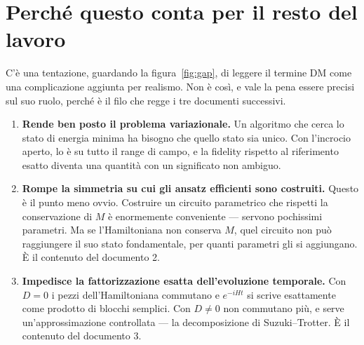 \documentclass[11pt,a4paper]{article}
\begin{document}
\FloatBarrier


\section{Perché questo conta per il resto del lavoro}

C'è una tentazione, guardando la figura~\ref{fig:gap}, di leggere il termine DM
come una complicazione aggiunta per realismo. Non è così, e vale la pena essere
precisi sul suo ruolo, perché è il filo che regge i tre documenti successivi.

\begin{enumerate}[leftmargin=1.5em,itemsep=4pt]
\item \textbf{Rende ben posto il problema variazionale.} Un algoritmo che cerca
lo stato di energia minima ha bisogno che quello stato sia unico. Con l'incrocio
aperto, lo è su tutto il range di campo, e la fidelity rispetto al riferimento
esatto diventa una quantità con un significato non ambiguo.

\item \textbf{Rompe la simmetria su cui gli ansatz efficienti sono costruiti.}
Questo è il punto meno ovvio. Costruire un circuito parametrico che rispetti la
conservazione di $M$ è enormemente conveniente --- servono pochissimi parametri.
Ma se l'Hamiltoniana non conserva $M$, quel circuito non può raggiungere il suo
stato fondamentale, per quanti parametri gli si aggiungano. È il contenuto del
documento 2.

\item \textbf{Impedisce la fattorizzazione esatta dell'evoluzione temporale.}
Con $D=0$ i pezzi dell'Hamiltoniana commutano e $e^{-iHt}$ si scrive
esattamente come prodotto di blocchi semplici. Con $D\neq0$ non commutano più, e
serve un'approssimazione controllata --- la decomposizione di Suzuki--Trotter.
È il contenuto del documento 3.
\end{enumerate}

\end{document}
